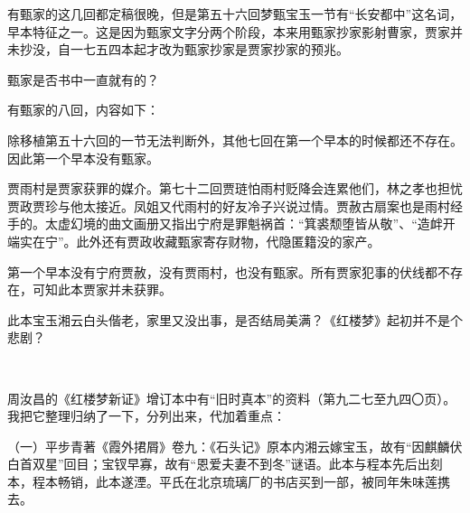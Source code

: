 \par 有甄家的这几回都定稿很晚，但是第五十六回梦甄宝玉一节有“长安都中”这名词，早本特征之一。这是因为甄家文字分两个阶段，本来用甄家抄家影射曹家，贾家并未抄没，自一七五四本起才改为甄家抄家是贾家抄家的预兆。
\par 甄家是否书中一直就有的？
\par 有甄家的八回，内容如下：
\par 除移植第五十六回的一节无法判断外，其他七回在第一个早本的时候都还不存在。因此第一个早本没有甄家。
\par 贾雨村是贾家获罪的媒介。第七十二回贾琏怕雨村贬降会连累他们，林之孝也担忧贾政贾珍与他太接近。凤姐又代雨村的好友冷子兴说过情。贾赦古扇案也是雨村经手的。太虚幻境的曲文画册又指出宁府是罪魁祸首：“箕裘颓堕皆从敬”、“造衅开端实在宁”。此外还有贾政收藏甄家寄存财物，代隐匿籍没的家产。
\par 第一个早本没有宁府贾赦，没有贾雨村，也没有甄家。所有贾家犯事的伏线都不存在，可知此本贾家并未获罪。
\par 此本宝玉湘云白头偕老，家里又没出事，是否结局美满？《红楼梦》起初并不是个悲剧？
\par  
\par 周汝昌的《红楼梦新证》增订本中有“旧时真本”的资料（第九二七至九四〇页）。我把它整理归纳了一下，分列出来，代加着重点：
\par （一）平步青著《霞外捃屑》卷九：《石头记》原本内湘云嫁宝玉，故有“因麒麟伏白首双星”回目；宝钗早寡，故有“恩爱夫妻不到冬”谜语。此本与程本先后出刻本，程本畅销，此本遂湮。平氏在北京琉璃厂的书店买到一部，被同年朱味莲携去。
